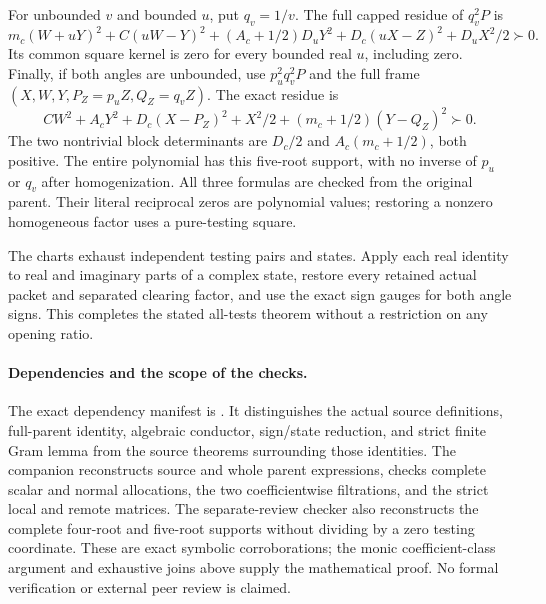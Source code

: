 For unbounded $v$ and bounded $u$, put $q_v=1/v$. The full capped
residue of $q_v^2P$ is
\[
 m_c(W+uY)^2+C(uW-Y)^2+(A_c+1/2)D_uY^2
                         +D_c(uX-Z)^2+D_uX^2/2\succ0.           \tag{RU29}
\]
Its common square kernel is zero for every bounded real $u$,
including zero. Finally, if both angles are unbounded, use
$p_u^2q_v^2P$ and the full frame
$(X,W,Y,P_Z=p_uZ,Q_Z=q_vZ)$. The exact residue is
\[
 CW^2+A_cY^2+D_c(X-P_Z)^2+X^2/2
                           +(m_c+1/2)(Y-Q_Z)^2\succ0.           \tag{RU30}
\]
The two nontrivial block determinants are $D_c/2$ and
$A_c(m_c+1/2)$, both positive. The entire polynomial has this
five-root support, with no inverse of $p_u$ or $q_v$ after
homogenization. All three formulas are checked from the original
parent. Their literal reciprocal zeros are polynomial values;
restoring a nonzero homogeneous factor uses a pure-testing square.

The charts exhaust independent testing pairs and states. Apply each
real identity to real and imaginary parts of a complex state, restore
every retained actual packet and separated clearing factor, and use
the exact sign gauges for both angle signs. This completes the stated
all-tests theorem without a restriction on any opening ratio.

\paragraph{Dependencies and the scope of the checks.}
The exact dependency manifest is
. It distinguishes the
actual source definitions, full-parent identity, algebraic conductor,
sign/state reduction, and strict finite Gram lemma from the source
theorems surrounding those identities. The companion
 reconstructs source and whole
parent expressions, checks complete scalar and normal allocations,
the two coefficientwise filtrations, and the strict local and remote
matrices. The separate-review checker
 also reconstructs the complete
four-root and five-root supports without dividing by a zero testing
coordinate. These are exact symbolic corroborations; the monic
coefficient-class argument and exhaustive joins above supply the
mathematical proof. No formal verification or external peer review
is claimed.
